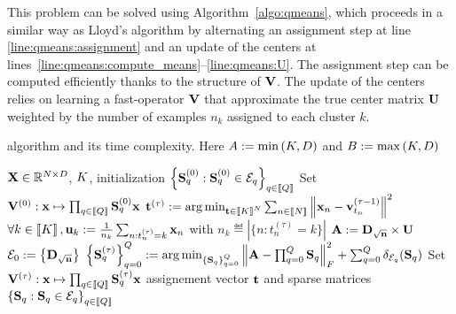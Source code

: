 This problem can be solved using Algorithm~\ref{algo:qmeans},
which proceeds in a similar way as Lloyd's algorithm by alternating an assignment step at line \ref{line:qmeans:assignment} and an update of the centers at lines~\ref{line:qmeans:compute_means}--\ref{line:qmeans:U}. The assignment step can be computed efficiently thanks to the structure of ${\mathbf{V}}$. The update of the centers relies on learning a fast-operator ${\mathbf{V}}$ 
that approximate the true center matrix ${\mathbf{U}}$ weighted by the number of examples $n_k$ assigned to each cluster $k$.


\begin{algorithm*}[t]
	\caption{\qkmeans algorithm and its time complexity. Here $A := \min\left (K, D\right )$ and $B := \max\left (K, D\right )$}
	\label{algo:qmeans}
	\begin{algorithmic}[1]
\REQUIRE ${\mathbf{X}} \in \mathbb{R}^{N \times D}$, $K$, initialization $\left \lbrace {\mathbf{S}}_q^{(0)} : {\mathbf{S}}_q^{(0)} \in \mathcal{E}_q\right \rbrace_{q\in\left \llbracket Q\right \rrbracket}$
\STATE Set ${\mathbf{V}}^{(0)} : {\mathbf{x}} \mapsto \prod_{q\in\left \llbracket Q\right \rrbracket}{{\mathbf{S}}_q^{(0)}} {\mathbf{x}}$
	\STATE ${\mathbf{t}}^{(\tau)} := \operatorname*{arg\,min}_{{\mathbf{t}} \in \left \llbracket K\right \rrbracket^N} \sum_{n\in\left \llbracket N\right \rrbracket} {\left \|{\mathbf{x}}_n - {\mathbf{v}}^{(\tau -1)}_{t_n}\right \|^2}$
	\label{line:qmeans:assignment}
	\STATE $\forall k\in\left \llbracket K\right \rrbracket, {\mathbf{u}}_k := \frac{1}{n_k} \sum_{n: t_n^{(\tau)}= k} {{\mathbf{x}}_n}$
with $n_k \eqdef |\{n: t_n^{(\tau)}=k\}|$
	\COMMENT{$\bigO{\nexamples\datadim}$}
	\label{line:qmeans:compute_means}
	\STATE ${\mathbf{A}} := {\mathbf{D}}_{\sqrt{{\mathbf{n}}}} \times {\mathbf{U}} $
	\COMMENT{$\bigO{\nclusters\datadim}$}
	\label{line:qmeans:A}
	\STATE $\mathcal{E}_0 := \left \lbrace {\mathbf{D}}_{\sqrt{{\mathbf{n}}}} \right \rbrace$
	\label{line:qmeans:E0}
	\STATE $\left \lbrace {\mathbf{S}}_q^{(\tau)}\right \rbrace_{q=0}^Q := \operatorname*{arg\,min}_{\left \lbrace {\mathbf{S}}_q\right \rbrace_{q=0}^Q} \left \|{\mathbf{A}} - \prod_{q=0}^Q{\mathbf{S}}_q\right \|_F^2 + \sum_{q=0}^Q \delta_{\mathcal{E}_q}({\mathbf{S}}_q)$
	\label{line:qmeans:S}
	\STATE Set ${\mathbf{V}}^{(\tau)} : {\mathbf{x}} \mapsto \prod_{q\in\left \llbracket Q\right \rrbracket}{{\mathbf{S}}_q^{(\tau)}} {\mathbf{x}}$
	\label{line:qmeans:U}
	\ENDFOR
	\ENSURE assignement vector ${\mathbf{t}}$ and sparse matrices $\left \lbrace {\mathbf{S}}_q : {\mathbf{S}}_q \in \mathcal{E}_q\right \rbrace_{q\in\left \llbracket Q\right \rrbracket}$ %
\end{algorithmic}
\end{algorithm*}

